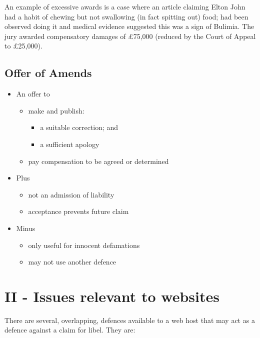 \documentclass[]{article}
\begin{document}
An example of excessive awards is a case where an article claiming Elton
John had a habit of chewing but not swallowing (in fact spitting out)
food; had been observed doing it and medical evidence suggested this was
a sign of Bulimia. The jury awarded compensatory damages of £75,000
(reduced by the Court of Appeal to £25,000).

\subsection{Offer of Amends}

\begin{itemize}
\item
  An offer to

  \begin{itemize}
  \item
    make and publish:

    \begin{itemize}
    \item
      a suitable correction; and
    \item
      a sufficient apology
    \end{itemize}
  \item
    pay compensation to be agreed or determined
  \end{itemize}
\item
  Plus

  \begin{itemize}
  \item
    not an admission of liability
  \item
    acceptance prevents future claim
  \end{itemize}
\item
  Minus

  \begin{itemize}
  \item
    only useful for innocent defamations
  \item
    may not use another defence
  \end{itemize}
\end{itemize}

\section{II - Issues relevant to websites}

There are several, overlapping, defences available to a web host that may act as a defence against a claim for libel. They are:
\end{document}
